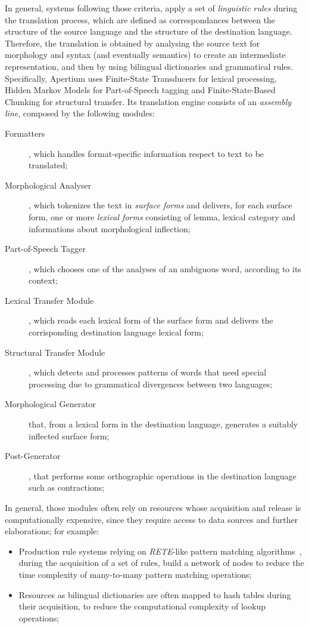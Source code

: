 \documentclass[11pt]{article}
\begin{document}
In general, systems following those criteria, apply a set of \emph{linguistic rules} during the translation process, which are defined as correspondances 
between the structure of the source language and the structure of the destination language. Therefore, the translation is obtained by analysing the source 
text for morphology and syntax (and eventually semantics) to create an intermediate representation, and then by using bilingual dictionaries and grammatical
rules.\\

Specifically, Apertium uses Finite-State Transducers for lexical processing, Hidden Markov Models for Part-of-Speech tagging and Finite-State-Based Chunking
for structural transfer. Its translation engine consists of an \emph{assembly line}, composed by the following modules: 

\begin{description}
 \item[Formatters], which handles format-specific information respect to text to be translated;
 \item[Morphological Analyser], which tokenizes the text in \emph{surface forms} and delivers, for each surface form, one or more \emph{lexical forms}
  consisting of lemma, lexical category and informations about morphological inflection;
 \item[Part-of-Speech Tagger], which chooses one of the analyses of an ambiguous word, according to its context;
 \item[Lexical Transfer Module], which reads each lexical form of the surface form and delivers the corrisponding destination language lexical form;
 \item[Structural Transfer Module], which detects and processes patterns of words that need special processing due to grammatical divergences between two
  languages;
 \item[Morphological Generator] that, from a lexical form in the destination language, generates a suitably inflected surface form;
 \item[Post-Generator], that performs some orthographic operations in the destination language such as contractions;
\end{description}

In general, those modules often rely on resources whose acquisition and release is computationally expensive, since they require access to data sources 
and further elaborations; for example:

\begin{itemize}
 \item Production rule systems relying on \emph{RETE}-like pattern matching algorithms~\citep{forgy}, during the acquisition of a set of rules, build a network of nodes
  to reduce the time complexity of many-to-many pattern matching operations;
 \item Resources as bilingual dictionaries are often mapped to hash tables during their acquisition, to reduce the computational complexity of lookup operations; 
\end{itemize}
\end{document}
